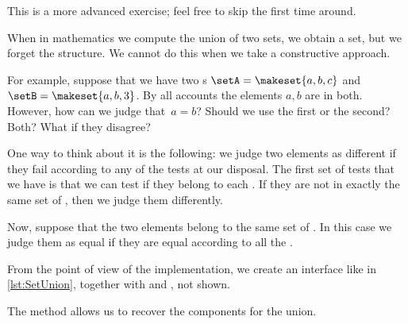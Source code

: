 \begin{remark}
    This is a more advanced exercise; feel free to skip the first time around.
\end{remark}

When in mathematics we compute the union of two sets, we obtain a set, but we forget the structure.
We cannot do this when we take a constructive approach.

For example, suppose that we have two \Setoid{}s $\setA = \makeset{a,b,c}$ and~$\setB = \makeset{a,b,3}$.
By all accounts the elements $a,b$ are in both.
However, how can we judge that~$a=b$?
Should we use the first  or the second?
Both?
What if they disagree?

One way to think about it is the following: we judge two elements as different if they fail according to any of the tests at our disposal.
The first set of tests that we have is that we can test if they belong to each .
If they are not in exactly the same set of , then we judge them differently.

Now, suppose that the two elements belong to the same set of .
In this case we judge them as equal if they are equal according to all the .




From the point of view of the implementation, we create an interface like in \cref{lst:SetUnion}, together with \EnumerableSetUnion and \FiniteSetUnion, not shown.


The method  allows us to recover the components for the union.

